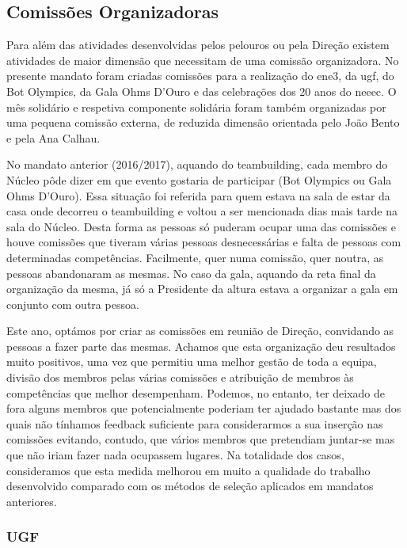 
\subsection{Comissões Organizadoras}

Para além das atividades desenvolvidas pelos pelouros ou pela Direção existem atividades de maior dimensão que necessitam de uma comissão organizadora. No presente mandato foram criadas comissões para a realização do \acrshort{ene3}, da \acrshort{ugf}, do Bot Olympics, da Gala Ohms D’Ouro e das celebrações dos 20 anos do \acrshort{neeec}. O mês solidário e respetiva componente solidária foram também organizadas por uma pequena comissão externa, de reduzida dimensão orientada pelo João Bento e pela Ana Calhau.

No mandato anterior (2016/2017), aquando do teambuilding, cada membro do Núcleo pôde dizer em que evento gostaria de participar (Bot Olympics ou Gala Ohms D'Ouro). Essa situação foi referida para quem estava na sala de estar da casa onde decorreu o teambuilding e voltou a ser mencionada dias mais tarde na sala do Núcleo. Desta forma as pessoas só puderam ocupar uma das comissões e houve comissões que tiveram várias pessoas desnecessárias e falta de pessoas com determinadas competências. Facilmente, quer numa comissão, quer noutra, as pessoas abandonaram as mesmas. No caso da gala, aquando da reta final da organização da mesma, já só a Presidente da altura estava a organizar a gala em conjunto com outra pessoa.

Este ano, optámos por criar as comissões em reunião de Direção, convidando as pessoas a fazer parte das mesmas. Achamos que esta organização deu resultados muito positivos, uma vez que permitiu uma melhor gestão de toda a equipa, divisão dos membros pelas várias comissões e atribuição de membros às competências que melhor desempenham. Podemos, no entanto, ter deixado de fora alguns membros que potencialmente poderiam ter ajudado bastante mas dos quais não tínhamos feedback suficiente para considerarmos a sua inserção nas comissões evitando, contudo, que vários membros que pretendiam juntar-se mas que não iriam fazer nada ocupassem lugares. Na totalidade dos casos, consideramos que esta medida melhorou em muito a qualidade do trabalho desenvolvido comparado com os métodos de seleção aplicados em mandatos anteriores.

\subsubsection{UGF}


